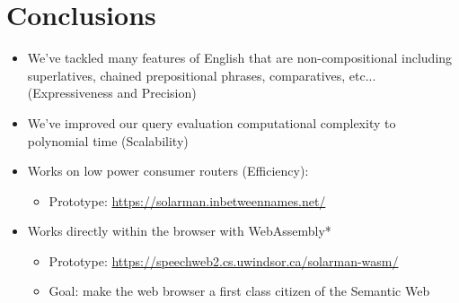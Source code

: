 \documentclass[logoontitle,tabu,supertabular,aspectratio=43]{preney-uwindsor-beamer}
\begin{document}
    \section{Conclusions}
    \begin{frame}{\insertsection}
        \begin{itemize}
            \item We've tackled many features of English that are non-compositional including superlatives, chained prepositional phrases, comparatives, etc... (Expressiveness and Precision)
            \item We've improved our query evaluation computational complexity to polynomial time (Scalability)
            \item Works on low power consumer routers (Efficiency):
            \begin{itemize}
                \item Prototype: \url{https://solarman.inbetweennames.net/}
            \end{itemize}
            \item Works directly within the browser with WebAssembly*
            \begin{itemize}
                \item Prototype: \url{https://speechweb2.cs.uwindsor.ca/solarman-wasm/}
                \item Goal: make the web browser a first class citizen of the Semantic Web
            \end{itemize}

        \end{itemize}
    \end{frame}
\end{document}
